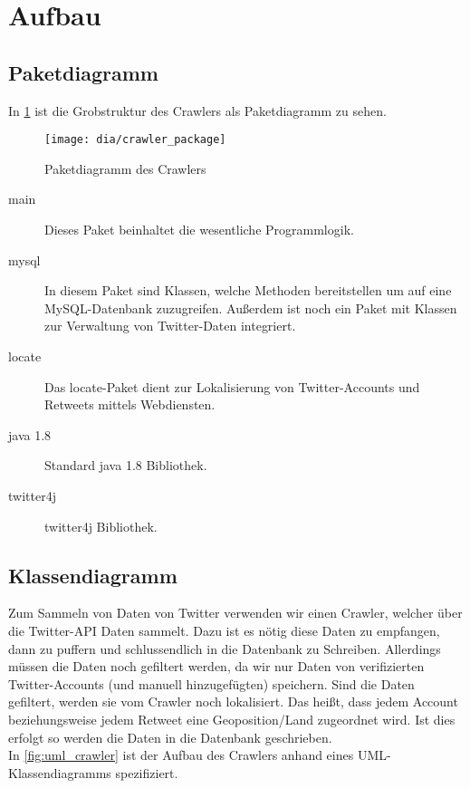 \section{Aufbau}

\subsection{Paketdiagramm}
In \cref{fig:crawler_package} ist die Grobstruktur des Crawlers als Paketdiagramm zu sehen.
\begin{figure}[h!]
	\centering
	\texttt{[image: dia/crawler\_package]}
	\caption{Paketdiagramm des Crawlers}
	\label{fig:crawler_package}
\end{figure}

\begin{description}
\item[main] Dieses Paket beinhaltet die wesentliche Programmlogik.
\item[mysql] In diesem Paket sind Klassen, welche Methoden bereitstellen um auf eine MySQL-Datenbank zuzugreifen. Außerdem ist noch ein Paket mit Klassen zur Verwaltung von Twitter-Daten integriert.
\item[locate] Das locate-Paket dient zur Lokalisierung von Twitter-Accounts und Retweets mittels Webdiensten.
\item[java 1.8] Standard java 1.8 Bibliothek.
\item[twitter4j] twitter4j Bibliothek.
\end{description}

\subsection{Klassendiagramm}
Zum Sammeln von Daten von Twitter verwenden wir einen Crawler, welcher über die Twitter-API Daten sammelt. Dazu ist es nötig diese Daten zu empfangen, dann zu puffern und schlussendlich in die Datenbank zu Schreiben. Allerdings müssen die Daten noch gefiltert werden, da wir nur Daten von verifizierten Twitter-Accounts (und manuell hinzugefügten) speichern. Sind die Daten gefiltert, werden sie vom Crawler noch lokalisiert. Das heißt, dass jedem Account beziehungsweise jedem Retweet eine Geoposition/Land zugeordnet wird. Ist dies erfolgt so werden die Daten in die Datenbank geschrieben.
\\ In \cref{fig:uml_crawler} ist der Aufbau des Crawlers anhand eines UML-Klassendiagramms spezifiziert.

